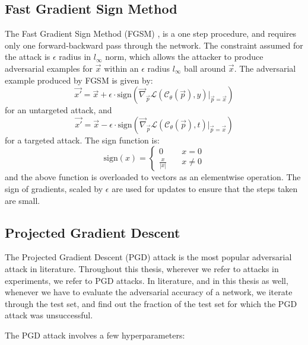 \documentclass[12pt, oneside]{book}
\begin{document}
\subsection{Fast Gradient Sign Method}
The Fast Gradient Sign Method (FGSM) \citep{Goodfellow2015ExplainingAH}, is a
one step procedure, and requires only one forward-backward pass through the
network. The constraint assumed for the attack is $\epsilon$ radius in
$l_\infty$ norm, which allows the attacker to produce adversarial examples for
$\vec{x}$ within an $\epsilon$ radius $l_\infty$ ball around $\vec{x}$. The
adversarial example produced by FGSM is given by:
\begin{equation*}
    \vec{x'}
    = \vec{x} + \epsilon \cdot
    \text{sign}(\vec{\nabla}_\vec{p} \mathcal{L}(\mathcal{C}_\theta (\vec{p}), y)
    \bigr \rvert_{\vec{p}=\vec{x}})
\end{equation*}
for an untargeted attack, and
\begin{equation*}
    \vec{x'}
    = \vec{x} - \epsilon \cdot
    \text{sign}(\vec{\nabla}_\vec{p} \mathcal{L}(\mathcal{C}_\theta (\vec{p}), t)
    \bigr \rvert_{\vec{p}=\vec{x}})
\end{equation*}
for a targeted attack. The sign function is:
\begin{equation*}
    \text{sign}(x) = 
    \left\{
        \begin{array}{ll}
            0 & \quad x = 0 \\
            \frac{x}{|x|} & \quad x \neq 0
        \end{array}
    \right.
\end{equation*}
and the above function is overloaded to vectors as an elementwise operation. The
sign of gradients, scaled by $\epsilon$ are used for updates to ensure that the
steps taken are small.


\subsection{Projected Gradient Descent}
The Projected Gradient Descent (PGD) \citep{madry2019deep} attack is the most
popular adversarial attack in literature. Throughout this thesis, wherever we
refer to attacks in experiments, we refer to PGD attacks. In literature, and in
this thesis as well, whenever we have to evaluate the adversarial accuracy of a
network, we iterate through the test set, and find out the fraction of the test
set for which the PGD attack was unsuccessful.

The PGD attack involves a few hyperparameters:
\end{document}
